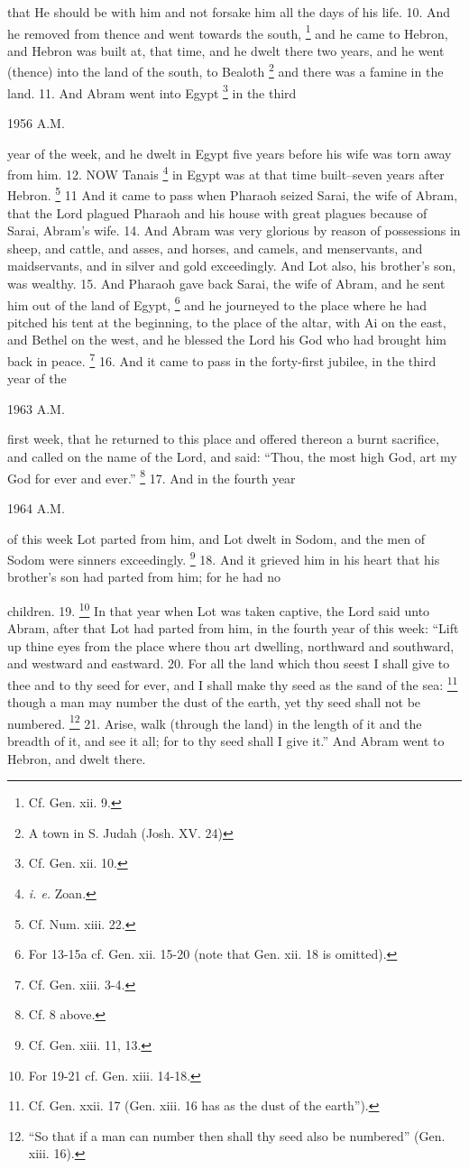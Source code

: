 that He should be with him and not forsake him all the days of his life. 10. And he removed from thence and went towards the south, \footnote{Cf. Gen. xii. 9.} and he came to Hebron, and Hebron was built at, that time, and he dwelt there two years, and he went (thence) into the land of the south, to Bealoth \footnote{A town in S. Judah (Josh. XV. 24)} and there was a famine in the land. 11. And Abram went into Egypt \footnote{Cf. Gen. xii. 10.} in the third

1956 A.M.

year of the week, and he dwelt in Egypt five years before his wife was torn away from him. 12. NOW Tanais \footnote{\emph{i. e.} Zoan.} in Egypt was at that time built--seven years after Hebron. \footnote{Cf. Num. xiii. 22.} 11 And it came to pass when Pharaoh seized Sarai, the wife of Abram, that the Lord plagued Pharaoh and his house with great plagues because of Sarai, Abram's wife. 14. And Abram was very glorious by reason of possessions in sheep, and cattle, and asses, and horses, and camels, and menservants, and maidservants, and in silver and gold exceedingly. And Lot also, his brother's son, was wealthy. 15. And Pharaoh gave back Sarai, the wife of Abram, and he sent him out of the land of Egypt, \footnote{For 13-15a cf. Gen. xii. 15-20 (note that Gen. xii. 18 is omitted).} and he journeyed to the place where he had pitched his tent at the beginning, to the place of the altar, with Ai on the east, and Bethel on the west, and he blessed the Lord his God who had brought him back in peace. \footnote{Cf. Gen. xiii. 3-4.} 16. And it came to pass in the forty-first jubilee, in the third year of the

1963 A.M.

first week, that he returned to this place and offered thereon a burnt sacrifice, and called on the name of the Lord, and said: ``Thou, the most high God, art my God for ever and ever.'' \footnote{Cf. 8 above.} 17. And in the fourth year

1964 A.M.

of this week Lot parted from him, and Lot dwelt in Sodom, and the men of Sodom were sinners exceedingly. \footnote{Cf. Gen. xiii. 11, 13.} 18. And it grieved him in his heart that his brother's son had parted from him; for he had no

children. 19. \footnote{For 19-21 cf. Gen. xiii. 14-18.} In that year when Lot was taken captive, the Lord said unto Abram, after that Lot had parted from him, in the fourth year of this week: ``Lift up thine eyes from the place where thou art dwelling, northward and southward, and westward and eastward. 20. For all the land which thou seest I shall give to thee and to thy seed for ever, and I shall make thy seed as the sand of the sea: \footnote{Cf. Gen. xxii. 17 (Gen. xiii. 16 has as the dust of the earth'').} though a man may number the dust of the earth, yet thy seed shall not be numbered. \footnote{``So that if a man can number then shall thy seed also be numbered'' (Gen. xiii. 16).} 21. Arise, walk (through the land) in the length of it and the breadth of it, and see it all; for to thy seed shall I give it.'' And Abram went to Hebron, and dwelt there.

